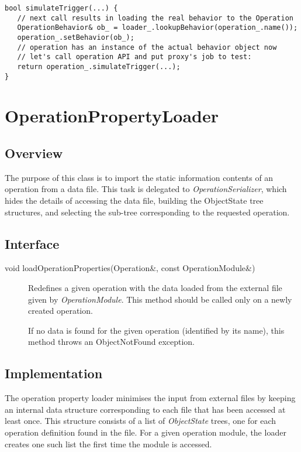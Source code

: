 \documentclass[a4paper,twoside]{tce}
\begin{document}
\begin{verbatim}
bool simulateTrigger(...) {
   // next call results in loading the real behavior to the Operation
   OperationBehavior& ob_ = loader_.lookupBehavior(operation_.name());
   operation_.setBehavior(ob_);
   // operation has an instance of the actual behavior object now
   // let's call operation API and put proxy's job to test:
   return operation_.simulateTrigger(...);
}
\end{verbatim}

\section{OperationPropertyLoader}
\label{sec:opPropertyLoader}

\subsection{Overview}

The purpose of this class is to import the static information contents of an
operation from a data file.  This task is delegated to
\emph{OperationSerializer}, which hides the details of accessing the data
file, building the ObjectState tree structures, and selecting the sub-tree
corresponding to the requested operation.

\subsection{Interface}

\begin{description}
\item[void loadOperationProperties(Operation\&, const OperationModule\&)]%
  Redefines a given operation with the data loaded from the external file
  given by \emph{OperationModule}. This method should be called only on a
  newly created operation.

  If no data is found for the given operation (identified by its name), this
  method throws an ObjectNotFound exception.

\end{description}

\subsection{Implementation}

The operation property loader minimises the input from external files by
keeping an internal data structure corresponding to each file that has been
accessed at least once.  This structure consists of a list of
\emph{ObjectState} trees, one for each operation definition found in the
file.  For a given operation module, the loader creates one such list the
first time the module is accessed.
\end{document}

